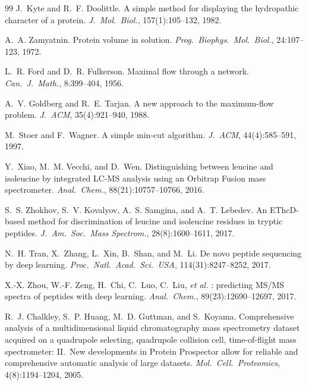 \documentclass[11pt,a4paper]{article}
\theoremstyle{definition}
\theoremstyle{remark}
\begin{document}
\begin{thebibliography}{99}
J.~Kyte and R.~F. Doolittle.
\newblock A simple method for displaying the hydropathic character of a
  protein.
\newblock \emph{J.\ Mol.\ Biol.}, 157(1):105--132, 1982.

A.~A. Zamyatnin.
\newblock Protein volume in solution.
\newblock \emph{Prog.\ Biophys.\ Mol.\ Biol.}, 24:107--123, 1972.

L.~R. Ford and D.~R. Fulkerson.
\newblock Maximal flow through a network.
\newblock \emph{Can.\ J.\ Math.}, 8:399--404, 1956.

A.~V. Goldberg and R.~E. Tarjan.
\newblock A new approach to the maximum-flow problem.
\newblock \emph{J.\ ACM}, 35(4):921--940, 1988.

M.~Stoer and F.~Wagner.
\newblock A simple min-cut algorithm.
\newblock \emph{J.\ ACM}, 44(4):585--591, 1997.

Y.~Xiao, M.~M. Vecchi, and D.~Wen.
\newblock Distinguishing between leucine and isoleucine by integrated
  {LC-MS} analysis using an {Orbitrap Fusion} mass spectrometer.
\newblock \emph{Anal.\ Chem.}, 88(21):10757--10766, 2016.

S.~S. Zhokhov, S.~V. Kovalyov, A.~S. Samgina, and A.~T. Lebedev.
\newblock An {EThcD}-based method for discrimination of leucine and
  isoleucine residues in tryptic peptides.
\newblock \emph{J.\ Am.\ Soc.\ Mass Spectrom.}, 28(8):1600--1611, 2017.

N.~H. Tran, X.~Zhang, L.~Xin, B.~Shan, and M.~Li.
\newblock De novo peptide sequencing by deep learning.
\newblock \emph{Proc.\ Natl.\ Acad.\ Sci.\ USA}, 114(31):8247--8252,
  2017.

X.-X. Zhou, W.-F. Zeng, H.~Chi, C.~Luo, C.~Liu, \emph{et al.}
: predicting {MS/MS} spectra of peptides with deep
  learning.
\newblock \emph{Anal.\ Chem.}, 89(23):12690--12697, 2017.

R.~J. Chalkley, S.~P. Huang, M.~D. Guttman, and S.~Koyama.
\newblock Comprehensive analysis of a multidimensional liquid
  chromatography mass spectrometry dataset acquired on a quadrupole
  selecting, quadrupole collision cell, time-of-flight mass spectrometer:
  {II}.\ New developments in {Protein Prospector} allow for reliable and
  comprehensive automatic analysis of large datasets.
\newblock \emph{Mol.\ Cell.\ Proteomics}, 4(8):1194--1204, 2005.


\end{thebibliography}
\end{document}
